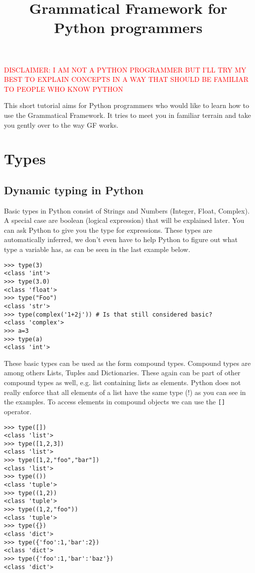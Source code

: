 \documentclass{scrartcl}
\title{Grammatical Framework for Python programmers}
\newcommand{\note}[1]{\textcolor{red}{\uppercase{#1}}}
\begin{document}
\maketitle
\note{disclaimer: i am not a python programmer but i'll try my best to explain concepts in a way that should be familiar to people who know python}

This short tutorial aims for Python programmers who would like to learn how to use the Grammatical Framework. It tries to meet you in familiar terrain and take you gently over to the way GF works.
\section{Types}
\subsection{Dynamic typing in Python}

Basic types in Python consist of Strings and Numbers (Integer, Float, Complex). A special case are boolean (logical expression) that will be explained later.
You can ask Python to give you the type for expressions. These types are automatically inferred, we don't even have to help Python to figure out what type
a variable has, as can be seen in the last example below.

\begin{verbatim}
>>> type(3)
<class 'int'>
>>> type(3.0)
<class 'float'>
>>> type("Foo")
<class 'str'>
>>> type(complex('1+2j')) # Is that still considered basic?
<class 'complex'>
>>> a=3
>>> type(a)
<class 'int'>
\end{verbatim}

These basic types can be used as the form compound types. Compound types are among others Lists, Tuples and Dictionaries.
These again can be part of other compound types as well, e.g. list containing lists as elements. Python does not really enforce
that all elements of a list have the same type (!) as you can see in the examples. To access elements in compound objects we
can use the \texttt{[]} operator.

\begin{verbatim}
>>> type([])
<class 'list'>
>>> type([1,2,3])
<class 'list'>
>>> type([1,2,"foo","bar"])
<class 'list'>
>>> type(())
<class 'tuple'>
>>> type((1,2))
<class 'tuple'>
>>> type((1,2,"foo"))
<class 'tuple'>
>>> type({})
<class 'dict'>
>>> type({'foo':1,'bar':2})
<class 'dict'>
>>> type({'foo':1,'bar':'baz'})
<class 'dict'>
\end{verbatim}
\end{document}
